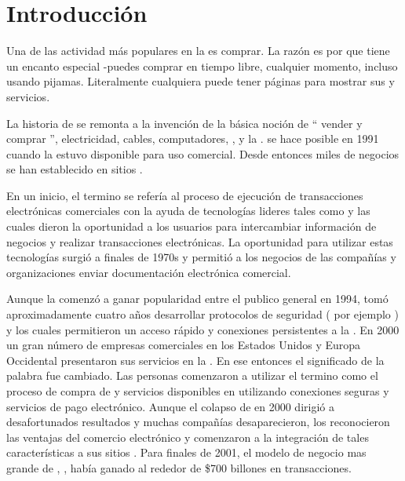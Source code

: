 \chapter{Introducción}\label{cap:intro}


Una de las actividad más populares en la \webINT es comprar. La razón es por que tiene un encanto especial -puedes comprar en tiempo libre, cualquier momento, incluso usando pijamas. Literalmente cualquiera puede tener páginas para mostrar sus \itemsCOM y servicios.

La historia de \ecommerce se remonta a la invención de la básica noción de “ vender y comprar ”, electricidad, cables, computadores, \modems, y la \internet. \ecommerce se hace posible en 1991 cuando la \internet estuvo disponible para uso comercial. Desde entonces miles de negocios se han establecido en sitios \webINT.

En un inicio, el termino \ecommerce se refería al proceso de ejecución  de transacciones electrónicas comerciales con la ayuda de tecnologías lideres tales como \edimeaning y \eftmeaning las cuales dieron la oportunidad a los usuarios para intercambiar información de negocios y realizar transacciones electrónicas. La oportunidad para utilizar estas tecnologías surgió a finales de 1970s y permitió a los negocios de las compañías y organizaciones enviar documentación electrónica comercial.

Aunque la \internet comenzó a ganar popularidad  entre el publico general en 1994, tomó aproximadamente cuatro años desarrollar protocolos de seguridad ( por ejemplo \httpNAME) y \dslNAME los cuales permitieron un acceso rápido y conexiones persistentes a la \internet. En 2000 un gran número de empresas comerciales en los Estados Unidos y Europa Occidental presentaron sus servicios en la \www. En ese entonces el significado de la palabra \ecommerce fue cambiado. Las personas comenzaron a utilizar el termino \ecommerce como el proceso de compra de \itemsCOM y servicios disponibles en \internet utilizando conexiones seguras y servicios de pago electrónico. Aunque el colapso de \dotcom en 2000 dirigió a desafortunados resultados y muchas compañías \ecommerce desaparecieron, los \retailers \brickandmortar reconocieron las ventajas del comercio electrónico y comenzaron a la integración de tales características a sus sitios \webINT. Para finales de 2001, el modelo de negocio mas grande de \ecommerce, \btob, había ganado al rededor de \$700 billones en transacciones.

